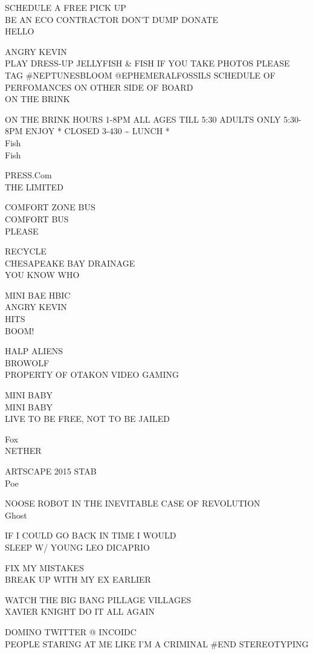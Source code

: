 \documentclass[10pt,letterpaper]{article}
\begin{document}
SCHEDULE A FREE PICK UP\\
BE AN ECO CONTRACTOR DON'T DUMP DONATE\\
HELLO

ANGRY KEVIN\\
PLAY DRESS{-}UP JELLYFISH \& FISH IF YOU TAKE PHOTOS PLEASE TAG \#NEPTUNESBLOOM @EPHEMERALFOSSILS SCHEDULE OF PERFOMANCES ON OTHER SIDE OF BOARD\\
ON THE BRINK

ON THE BRINK HOURS 1{-}8PM ALL AGES TILL 5:30 ADULTS ONLY 5:30{-}8PM ENJOY * CLOSED 3{-}430 \textasciitilde{} LUNCH *\\
Fish\\
Fish

PRESS.Com\\
THE LIMITED

COMFORT ZONE BUS\\
COMFORT BUS\\
PLEASE

RECYCLE\\
CHESAPEAKE BAY DRAINAGE\\
YOU KNOW WHO

MINI BAE HBIC\\
ANGRY KEVIN\\
HITS\\
BOOM!

HALP ALIENS\\
BROWOLF\\
PROPERTY OF OTAKON VIDEO GAMING

MINI BABY\\
MINI BABY\\
LIVE TO BE FREE, NOT TO BE JAILED

Fox\\
NETHER

ARTSCAPE 2015 STAB\\
Poe

NOOSE ROBOT IN THE INEVITABLE CASE OF REVOLUTION\\
Ghost

IF I COULD GO BACK IN TIME I WOULD\\
SLEEP W/ YOUNG LEO DICAPRIO

FIX MY MISTAKES\\
BREAK UP WITH MY EX EARLIER

WATCH THE BIG BANG PILLAGE VILLAGES\\
XAVIER KNIGHT DO IT ALL AGAIN

DOMINO TWITTER @ INCOIDC\\
PEOPLE STARING AT ME LIKE I'M A CRIMINAL \#END STEREOTYPING
\end{document}
